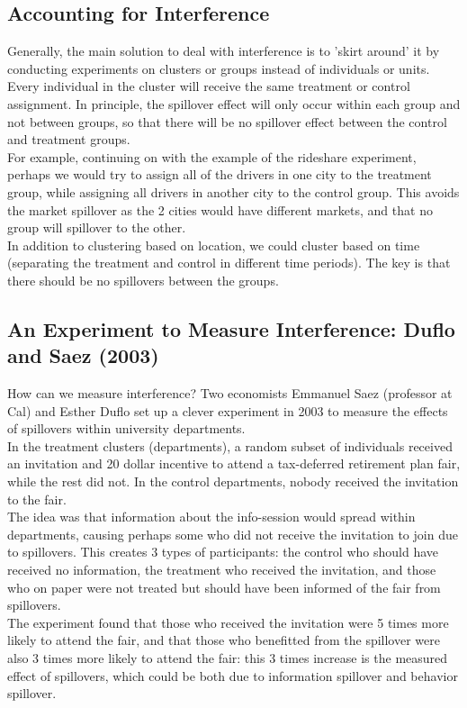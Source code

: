 \documentclass{article}
\begin{document}
\subsection{Accounting for Interference}
Generally, the main solution to deal with interference is to 'skirt around' it by conducting experiments on clusters or groups instead of individuals or units. 
Every individual in the cluster will receive the same treatment or control assignment.
In principle, the spillover effect will only occur within each group and not between groups, so that there will be no spillover effect between the control and treatment groups. 
\\
For example, continuing on with the example of the rideshare experiment, perhaps we would try to assign all of the drivers in one city to the treatment group, while assigning all drivers in another city to the control group. 
This avoids the market spillover as the 2 cities would have different markets, and that no group will spillover to the other. 
\\
In addition to clustering based on location, we could cluster based on time (separating the treatment and control in different time periods).
The key is that there should be no spillovers between the groups.

\subsection{An Experiment to Measure Interference: Duflo and Saez (2003)}
How can we measure interference?
Two economists Emmanuel Saez (professor at Cal) and Esther Duflo set up a clever experiment in 2003 to measure the effects of spillovers within university departments.
\\
In the treatment clusters (departments), a random subset of individuals received an invitation and 20 dollar incentive to attend a tax-deferred retirement plan fair, while the rest did not.
In the control departments, nobody received the invitation to the fair.
\\
The idea was that information about the info-session would spread within departments, causing perhaps some who did not receive the invitation to join due to spillovers.
This creates 3 types of participants: the control who should have received no information, the treatment who received the invitation, and those who on paper were not treated but should have been informed of the fair from spillovers.
\\
The experiment found that those who received the invitation were 5 times more likely to attend the fair, and that those who benefitted from the spillover were also 3 times more likely to attend the fair: this 3 times increase is the measured effect of spillovers, which could be both due to information spillover and behavior spillover.
\end{document}
